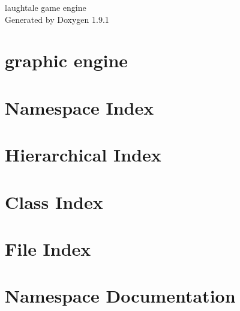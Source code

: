 \let\mypdfximage\pdfximage\def\pdfximage{\immediate\mypdfximage}\documentclass[twoside]{book}
\newcommand{\+}{\discretionary{\mbox{\scriptsize$\hookleftarrow$}}{}{}}
\newcommand{\clearemptydoublepage}{%
  \newpage{\pagestyle{empty}\cleardoublepage}%
}
\begin{document}
\raggedbottom

\hypersetup{pageanchor=false,
             bookmarksnumbered=true,
             pdfencoding=unicode
            }
\begin{titlepage}
\vspace*{7cm}
\begin{center}%
{\Large laughtale game engine }\\
\vspace*{1cm}
{\large Generated by Doxygen 1.9.1}\\
\end{center}
\end{titlepage}
\clearemptydoublepage
{}
\tableofcontents
\clearemptydoublepage
{}
\hypersetup{pageanchor=true}

\chapter{graphic engine}
\label{md_README}

\chapter{Namespace Index}

\chapter{Hierarchical Index}

\chapter{Class Index}

\chapter{File Index}

\chapter{Namespace Documentation}

\end{document}
